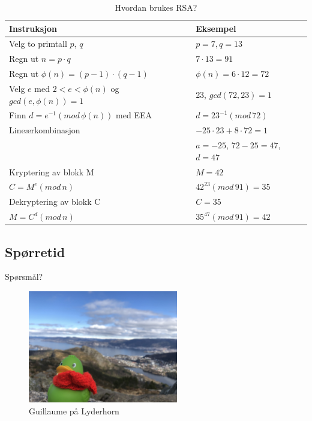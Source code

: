 \begin{frame}{}
\begin{table}
\begin{tabular}{l|l}
Instruksjon & Eksempel\\ \hline
Velg to primtall $p$, $q$ & $p=7, q=13$\\
Regn ut $n=p\cdot q$ & $7\cdot 13=91$\\
Regn ut $\phi(n)=(p-1)\cdot(q-1)$&$\phi(n)=6\cdot12=72$\\
Velg $e$ med $2<e<\phi(n)$ og $gcd(e,\phi(n))=1$&23, $gcd(72,23)=1$\\
Finn $d=e^{-1} (mod\, \phi(n))$ med EEA & $d=23^{-1} (mod\, 72)$\\
\indent\hspace{3mm} Lineærkombinasjon & $-25\cdot 23+8\cdot 72=1$\\
& $a=-25$, $72-25=47$, $d=47$\\
Kryptering av blokk M & $M=42$\\
\indent\hspace{3mm} $C=M^e(mod\, n)$&$42^{23} (mod\, 91)=35$\\
Dekryptering av blokk C & $C=35$\\
\indent\hspace{3mm} $M=C^d(mod\, n)$&$35^{47} (mod\, 91)=42$
\end{tabular}
\caption{Hvordan brukes RSA?}
\end{table}
\end{frame}

\subsection*{Spørretid}
\begin{frame}{Spørsmål?}
    \begin{figure}
        \centering
        \includegraphics[height = 4.9cm]{images/guillaume8.jpg}
        \caption{Guillaume på Lyderhorn}
        \label{fig:guillaume8}
    \end{figure}
\end{frame}
